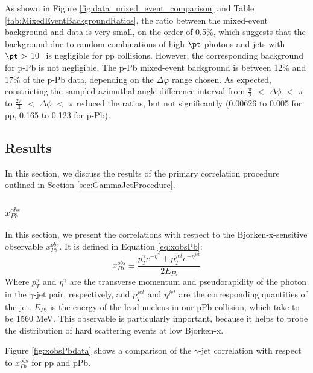 As shown in Figure \ref{fig:data_mixed_event_comparison} and Table \ref{tab:MixedEventBackgroundRatios}, the ratio between the mixed-event background and data is very small, on the order of 0.5\%, which suggests that the background due to random combinations of high $\pt$ photons and jets with $\pt>$ 10 \GeVc~is negligible for pp collisions. However, the corresponding background for p-Pb is not negligible. The p-Pb mixed-event background is between 12\% and 17\% of the p-Pb data, depending on the $\Delta\varphi$ range chosen. As expected, constricting the sampled azimuthal angle difference interval from $\frac{\pi}{2}$ $<$ $\Delta \phi$ $<$ $\pi$ to $\frac{2 \pi}{3}$ $<$ $\Delta \phi$ $<$ $\pi$ reduced the ratios, but not significantly (0.00626 to 0.005 for pp, 0.165 to 0.123 for p-Pb).


\subsection{Results}
\label{sec:GammaJetResults}
In this section, we discuss the results of the primary correlation procedure outlined in Section \ref{sec:GammaJetProcedure}.
\subsubsection{$x^{obs}_{Pb}$}
\label{sec:GammaJetResultsxobsPb}
In this section, we present the correlations with respect to the Bjorken-x-sensitive observable $x^{obs}_{Pb}$. It is defined in Equation \ref{eq:xobsPb}:
\begin{equation}
    x^{obs}_{Pb} \equiv \frac{p_{T}^{\gamma}e^{-\eta^{\gamma}}+p_{T}^{jet}e^{-\eta^{jet}}}{2E_{Pb}}
    \label{eq:xobsPb}
\end{equation}
Where $p_{T}^{\gamma}$ and $\eta^{\gamma}$ are the transverse momentum and pseudorapidity of the photon in the $\gamma$-jet pair, respectively, and  $p_{T}^{jet}$ and $\eta^{jet}$ are the corresponding quantities of the jet. $E_{Pb}$ is the energy of the lead nucleus in our pPb collision, which take to be 1560 MeV. This observable is particularly important, because it helps to probe the distribution of hard scattering events at low Bjorken-x.  

Figure \ref{fig:xobsPbdata} shows a comparison of the $\gamma$-jet correlation with respect to $x^{obs}_{Pb}$ for pp and pPb.


